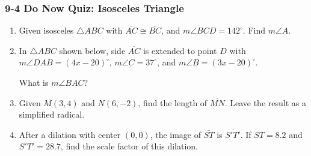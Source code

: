 \documentclass[12pt, twoside]{article}
\begin{document}
\subsubsection*{9-4 Do Now Quiz: Isosceles Triangle}
  \begin{enumerate}

      \item Given isosceles $\triangle ABC$ with $\overline{AC} \cong \overline{BC}$, and $m\angle BCD=142^\circ$. Find $m\angle A$.\\[1cm]
        \vspace{3cm}

      \item In  $\triangle ABC$ shown below, side $\overline{AC}$ is extended to point $D$ with $m\angle DAB=(4x-20)^\circ$, $m\angle C=37^\circ$, and $m\angle B=(3x-20)^\circ$.
        \begin{center}
        \end{center}
        What is $m\angle BAC$?

\newpage
  \item Given $M(3,4)$ and $N(6,-2)$, find the length of $\overline{MN}$. Leave  the result as a simplified radical.
      \vspace{4cm}

  \item After a dilation with center $(0,0)$, the image of $\overline{ST}$ is $\overline{S'T'}$. If $ST=8.2$ and $S'T'=28.7$, find the scale factor of this dilation. \vspace{3cm}


\end{enumerate}
\end{document}
